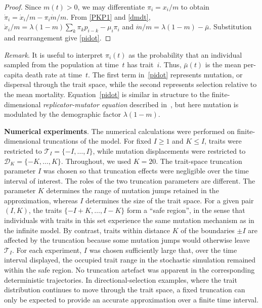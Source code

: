 \documentclass[12pt]{article}
\newcommand\T{\ensuremath{\mathcal{T}}}
\newcommand\D{\ensuremath{\mathcal{D}}}
\begin{document}
\begin{proof}
Since $m(t)>0$, we may differentiate $\pi_i=x_i/m$ to obtain
$\dot\pi_i=\dot x_i/m-\pi_i\dot m/m$. From \eqref{PKP1} and
\eqref{dmdt}, $\dot x_i/m=\lambda(1-m)\sum_k\pi_kp_{i-k}-\mu_i\pi_i$ and
$\dot m/m=\lambda(1-m)-\bar\mu$. Substitution and rearrangement give
\eqref{pidot}.
\end{proof}

\noindent
\emph{Remark}.
It is useful to interpret $\pi_i(t)$ as the probability that an
individual sampled from the population at time~$t$ has trait~$i$. Thus,
$\bar\mu(t)$ is the mean per-capita death rate at time~$t$. The first
term in~\eqref{pidot} represents mutation, or dispersal through the trait
space, while the second represents selection relative to the mean
mortality. Equation~\eqref{pidot} is similar in structure to the
finite-dimensional \emph{replicator-mutator equation} described
in~\cite{PN2002}, but here mutation is modulated by the demographic
factor $\lambda(1-m)$.

\medskip
\noindent
{\bf Numerical experiments}.
The numerical calculations were performed on finite-dimensional
truncations of the model. For fixed $I\geq 1$ and $K\leq I$, traits were
restricted to $\T_I=\{-I,\ldots,I\}$, while mutation displacements were
restricted to $\D_K=\{-K,\ldots,K\}$. Throughout, we used \mbox{$K=20$}.
The trait-space truncation parameter $I$ was chosen so that truncation
effects were negligible over the time interval of interest. The roles of
the two truncation parameters are different. The parameter $K$
determines the range of mutation jumps retained in the approximation,
whereas $I$ determines the size of the trait space. For a given pair
$(I,K)$, the traits $\{-I+K,\ldots,I-K\}$ form a ``safe region'', in the
sense that individuals with traits in this set experience the same
mutation mechanism as in the infinite model. By contrast, traits within
distance $K$ of the boundaries $\pm I$ are affected by the truncation
because some mutation jumps would otherwise leave $\T_I$. 
For each experiment, $I$ was chosen sufficiently large that, over the
time interval displayed, the occupied trait range in the stochastic
simulation remained within the safe region. No truncation artefact was
apparent in the corresponding deterministic trajectories. In
directional-selection examples, where the trait distribution continues
to move through the trait space, a fixed truncation can only be expected to
provide an accurate approximation over a finite time interval.
\end{document}
